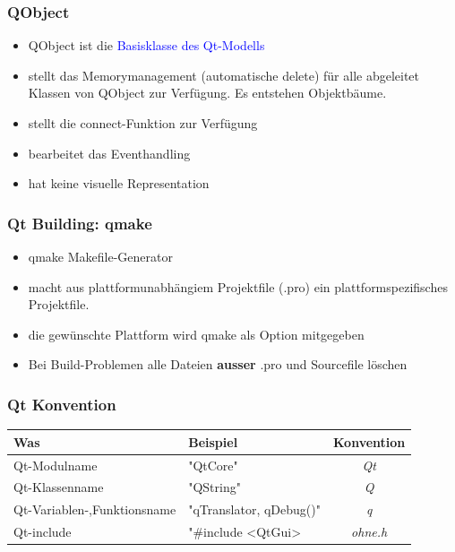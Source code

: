 \begin{multicols}{2}
	\subsubsection{QObject}
	\begin{itemize}
		\item QObject ist die \textcolor{blue}{Basisklasse des Qt-Modells}
		\item stellt das Memorymanagement (automatische delete) für alle abgeleitet Klassen von QObject zur \newline Verfügung. Es entstehen Objektbäume. 
		\item stellt die connect-Funktion zur Verfügung
		\item bearbeitet das Eventhandling
		\item hat keine visuelle Representation
	\end{itemize}
	
	\subsubsection{Qt Building: qmake}
	\begin{itemize}
		\item qmake Makefile-Generator
		\item macht aus plattformunabhängiem Projektfile (.pro) ein plattformspezifisches Projektfile. 
		\item die gewünschte Plattform wird qmake als Option \newline mitgegeben
		\item Bei Build-Problemen alle Dateien \textbf{ausser} .pro und Sourcefile löschen
	\end{itemize}
\end{multicols}

\subsubsection{Qt Konvention}
\begin{tabular}{|l|l|c|}
	\hline \textbf{Was}&\textbf{Beispiel} &\textbf{Konvention}
    \\ \hline   
    Qt-Modulname& "QtCore"&\textit{Qt}
    \\ \hline  
    Qt-Klassenname & "QString" &\textit{Q}
    \\ \hline   
    Qt-Variablen-,Funktionsname & "qTranslator, qDebug()"&\textit{q}
    \\ \hline   
    Qt-include & "\#include <QtGui>& \textit{ohne.h}
    \\ \hline
\end{tabular}

